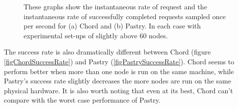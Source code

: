 \begin{figure}[!htb]
  \centering
  \caption{These graphs show the instantaneous rate of request and the instantaneous rate of successfully completed requests sampled once per second for (a) Chord and (b) Pastry. In each case with experimental set-ups of slightly above 60 nodes.}
\end{figure}

The success rate is also dramatically different between Chord (figure \ref{figChordSuccessRate}) and Pastry (\ref{figPastrySuccessRate}). Chord seems to perform better when more than one node is run on the same machine, while Pastry's success rate slightly decreases the more nodes are run on the same physical hardware. It is also worth noting that even at its best, Chord can't compare with the worst case performance of Pastry.


